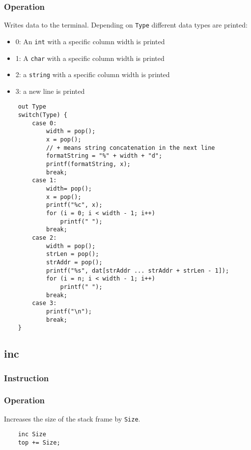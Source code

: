 \subsubsection{Operation}
Writes data to the terminal. Depending on \lstinline$Type$ different data types are printed:

\begin{itemize}
	\item 0: An \lstinline$int$ with a specific column width is printed
	\item 1: A \lstinline$char$ with a specific column width is printed
	\item 2: a \lstinline$string$ with a specific column width is printed
	\item 3: a new line is printed
\end{itemize}

	\begin{lstlisting}
	out Type
	switch(Type) {
		case 0:
			width = pop();
			x = pop();
			// + means string concatenation in the next line
			formatString = "%" + width + "d";
			printf(formatString, x);
			break;
		case 1:
			width= pop();
			x = pop();
			printf("%c", x);
			for (i = 0; i < width - 1; i++)
				printf(" ");
			break;
		case 2:
			width = pop();
			strLen = pop();
			strAddr = pop();
			printf("%s", dat[strAddr ... strAddr + strLen - 1]);
			for (i = n; i < width - 1; i++)
				printf(" ");
			break;
		case 3:
			printf("\n");
			break;
	}
	\end{lstlisting}

\subsection{inc}
\subsubsection{Instruction}

\subsubsection{Operation}
Increases the size of the stack frame by \lstinline$Size$.

	\begin{lstlisting}
	inc Size
	top += Size;
	\end{lstlisting}

